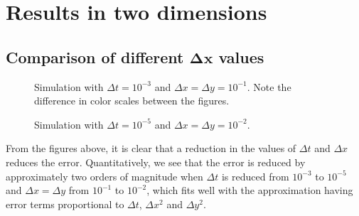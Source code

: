 \section{Results in two dimensions}

\subsection{Comparison of different \(\boldsymbol{\Delta x}\) values}

\begin{figure}[H]

\caption{Simulation with \(\Delta t = 10^{-3}\) and \(\Delta x = \Delta y = 10^{-1}\). Note the difference in color scales between the figures.}
\end{figure}

\begin{figure}[H]

\caption{Simulation with \(\Delta t = 10^{-5}\) and \(\Delta x = \Delta y = 10^{-2}\).}
\end{figure}

From the figures above, it is clear that a reduction in the values of \(\Delta t\) and \(\Delta x\) reduces the error. Quantitatively, we see that the error is reduced by approximately two orders of magnitude when \(\Delta t\) is reduced from \(10^{-3}\) to \(10^{-5}\) and \(\Delta x = \Delta y\) from \(10^{-1}\) to \(10^{-2}\), which fits well with the approximation having error terms proportional to \(\Delta t\), \(\Delta x^2\) and \(\Delta y^2\).
